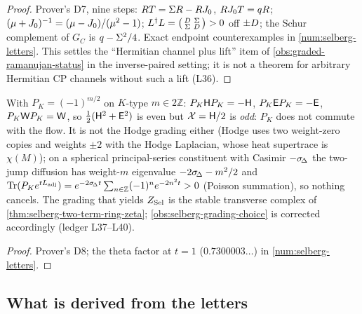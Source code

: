 \begin{proof}
Prover's D7, nine steps: $RT = \Sigma R-RJ_0$, $RJ_0T = q R$; $(\mu+J_0)^{-1} = (\mu-J_0)/(\mu^2-1)$;
$L^\dagger L = \bigl(\begin{smallmatrix}D&\Sigma\\\Sigma&D\end{smallmatrix}\bigr)>0$ off $\pm D$;
the Schur complement of $G_C$ is $q-\Sigma^2/4$. Exact endpoint counterexamples in
\cref{num:selberg-letters}. This settles the ``Hermitian channel plus lift'' item of
\cref{obs:graded-ramanujan-status} in the inverse-paired setting; it is not a theorem for
arbitrary Hermitian CP channels without such a lift (L36).
\end{proof}

\begin{proposition}
\label{prop:ktype-not-flow-grading}
With $P_K = (-1)^{m/2}$ on $K$-type $m\in2\mathbb Z$: $P_K\mathsf H P_K = -\mathsf H$, $P_K\mathsf E P_K =
-\mathsf E$, $P_K\mathsf W P_K = \mathsf W$, so $\tfrac12(\mathsf H^2+\mathsf E^2)$ is even but $\mathcal X = \mathsf H/2$ is
\emph{odd}: $P_K$ does not commute with the flow. It is not the Hodge grading either (Hodge uses
two weight-zero copies and weights $\pm2$ with the Hodge Laplacian, whose heat supertrace is
$\chi(M)$); on a spherical principal-series constituent with Casimir $-\sigma_{\!\Delta}$ the two-jump
diffusion has weight-$m$ eigenvalue $-2\sigma_{\!\Delta}-m^2/2$ and
$\operatorname{Tr}(P_Ke^{tL_{\mathrm{adj}}}) = e^{-2\sigma_{\!\Delta} t}\sum_{n\in\mathbb Z}(-1)^ne^{-2n^2t}>0$ (Poisson
summation), so nothing cancels. The grading that yields $Z_{\mathrm{Sel}}$ is the stable transverse complex
of \cref{thm:selberg-two-term-ring-zeta}; \cref{obs:selberg-grading-choice} is corrected
accordingly (ledger L37--L40).
\end{proposition}
\begin{proof}
Prover's D8; the theta factor at $t = 1$ ($0.7300003\ldots$) in \cref{num:selberg-letters}.
\end{proof}

\subsection{What is derived from the letters}

